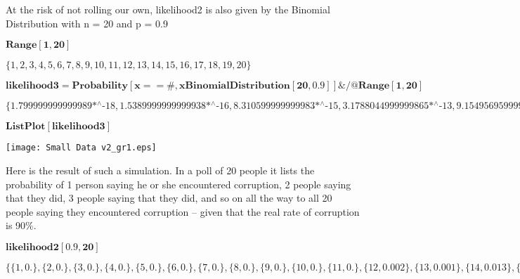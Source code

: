 \documentclass{article}
\newcommand{\unicode}[1]{{}}
\begin{document}
At the risk of not rolling our own, likelihood2 is also given by the Binomial Distribution with n = 20 and p = 0.9

\begin{doublespace}
\noindent\(\pmb{\text{Range}[1,20]}\)
\end{doublespace}

\begin{doublespace}
\noindent\(\{1,2,3,4,5,6,7,8,9,10,11,12,13,14,15,16,17,18,19,20\}\)
\end{doublespace}

\begin{doublespace}
\noindent\(\pmb{\text{likelihood3} = \text{Probability}[x == \#,x \unicode{f3d2}\text{BinomialDistribution}[20,0.9]] \& \text{/@} \text{Range}[1,20]
}\)
\end{doublespace}

\begin{doublespace}
\noindent\(\{\text{1.799999999999989$\grave{ }$*${}^{\wedge}$-18},\text{1.5389999999999938$\grave{ }$*${}^{\wedge}$-16},\text{8.310599999999983$\grave{
}$*${}^{\wedge}$-15},\text{3.1788044999999865$\grave{ }$*${}^{\wedge}$-13},\text{9.154956959999962$\grave{ }$*${}^{\wedge}$-12},\text{2.0598653159999982$\grave{
}$*${}^{\wedge}$-10},\text{3.707757568799986$\grave{ }$*${}^{\wedge}$-9},\text{5.4225954443699406$\grave{ }$*${}^{\wedge}$-8},\text{6.507114533243984$\grave{
}$*${}^{\wedge}$-7},\text{6.442043387911565$\grave{ }$*${}^{\wedge}$-6},0.0000527076,0.000355776,0.00197045,0.00886704,0.0319214,0.0897788,0.19012,0.28518,0.27017,0.121577\}\)
\end{doublespace}

\begin{doublespace}
\noindent\(\pmb{\text{ListPlot}[\text{likelihood3}]}\)
\end{doublespace}

\texttt{[image: Small Data v2\_gr1.eps]}

Here is the result of such a simulation. In a poll of 20 people it lists the probability of 1 person saying he or she encountered corruption, 2 people
saying that they did, 3 people saying that they did, and so on all the way to all 20 people saying they encountered corruption -- given that the
real rate of corruption is 90$\%$.

\begin{doublespace}
\noindent\(\pmb{\text{likelihood2}[0.9,20]}\)
\end{doublespace}

\begin{doublespace}
\noindent\(\{\{1,0.\},\{2,0.\},\{3,0.\},\{4,0.\},\{5,0.\},\{6,0.\},\{7,0.\},\{8,0.\},\{9,0.\},\{10,0.\},\{11,0.\},\{12,0.002\},\{13,0.001\},\{14,0.013\},\{15,0.043\},\{16,0.081\},\{17,0.204\},\{18,0.296\},\{19,0.26\},\{20,0.1\}\}\)
\end{doublespace}
\end{document}
